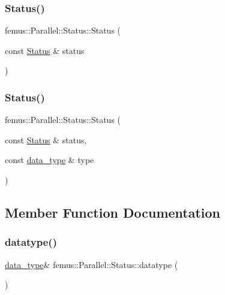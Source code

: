\subsubsection{\texorpdfstring{Status()}{Status()}\hspace{0.1cm}{\footnotesize\ttfamily [5/6]}}
{\footnotesize\ttfamily femus\+::\+Parallel\+::\+Status\+::\+Status (\begin{DoxyParamCaption}\item[{const \mbox{\hyperlink{classfemus_1_1_parallel_1_1_status}{Status}} \&}]{status }\end{DoxyParamCaption})\hspace{0.3cm}{\ttfamily [inline]}}

\mbox{\label{classfemus_1_1_parallel_1_1_status_a998e0ca9de0b0f42adaa3f4d34caa766}} 
\subsubsection{\texorpdfstring{Status()}{Status()}\hspace{0.1cm}{\footnotesize\ttfamily [6/6]}}
{\footnotesize\ttfamily femus\+::\+Parallel\+::\+Status\+::\+Status (\begin{DoxyParamCaption}\item[{const \mbox{\hyperlink{classfemus_1_1_parallel_1_1_status}{Status}} \&}]{status,  }\item[{const \mbox{\hyperlink{structfemus_1_1_parallel_1_1data__type}{data\+\_\+type}} \&}]{type }\end{DoxyParamCaption})\hspace{0.3cm}{\ttfamily [inline]}}



\subsection{Member Function Documentation}
\mbox{\label{classfemus_1_1_parallel_1_1_status_a993ed62e0f7230ff534ffd1d7d892ee5}} 
\subsubsection{\texorpdfstring{datatype()}{datatype()}\hspace{0.1cm}{\footnotesize\ttfamily [1/2]}}
{\footnotesize\ttfamily \mbox{\hyperlink{structfemus_1_1_parallel_1_1data__type}{data\+\_\+type}}\& femus\+::\+Parallel\+::\+Status\+::datatype (\begin{DoxyParamCaption}{ }\end{DoxyParamCaption})\hspace{0.3cm}{\ttfamily [inline]}}

